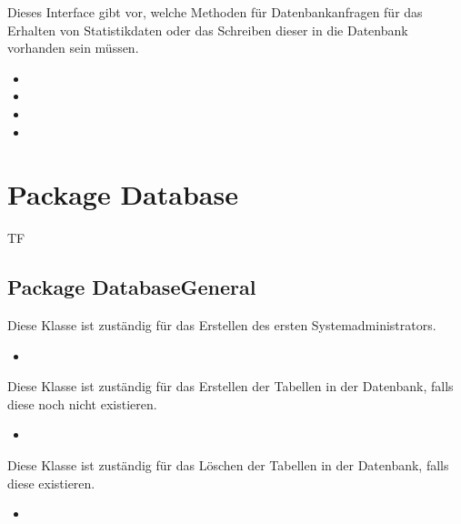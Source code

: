 \documentclass[a4paper]{scrreprt}
\begin{document}
	Dieses Interface gibt vor, welche Methoden für Datenbankanfragen für das Erhalten von Statistikdaten oder das Schreiben dieser in die Datenbank vorhanden sein müssen.
	\begin{itemize}
		\item {}
		\item {}
		\item {}
		\item {}
	\end{itemize}
	
	\section{Package Database}
	\begin{tiny}
		TF
	\end{tiny}
	\subsection{Package DatabaseGeneral}
	
	Diese Klasse ist zuständig für das Erstellen des ersten Systemadministrators.
	\begin{itemize}
		\item {}
	\end{itemize}
	
	Diese Klasse ist zuständig für das Erstellen der Tabellen in der Datenbank, falls diese noch nicht existieren.
	\begin{itemize}
		\item {}
	\end{itemize}
	
	Diese Klasse ist zuständig für das Löschen der Tabellen in der Datenbank, falls diese existieren.
	\begin{itemize}
		\item {}
	\end{itemize}
	
\end{document}
